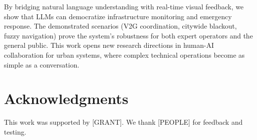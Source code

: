 \documentclass[sigconf]{acmart}
\begin{document}
By bridging natural language understanding with real-time visual feedback, we show that LLMs can democratize infrastructure monitoring and emergency response. The demonstrated scenarios (V2G coordination, citywide blackout, fuzzy navigation) prove the system's robustness for both expert operators and the general public. This work opens new research directions in human-AI collaboration for urban systems, where complex technical operations become as simple as a conversation.

\section*{Acknowledgments}
This work was supported by [GRANT]. We thank [PEOPLE] for feedback and testing.


\end{document}
